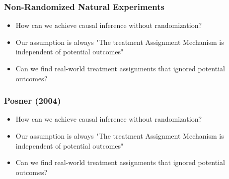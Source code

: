 \documentclass[xcolor=x11names,compress]{beamer}\usepackage[]{graphicx}\usepackage[]{color}
\renewcommand{\(}{\begin{columns}}
\renewcommand{\)}{\end{columns}}
\newcommand{\<}[1]{\begin{column}{#1}}
\renewcommand{\>}{\end{column}}
\begin{document}
\begin{frame}
\frametitle{Non-Randomized Natural Experiments}
\begin{itemize}
\item How can we achieve causal inference without randomization?
\pause
\item Our assumption is always "The treatment Assignment Mechanism is independent of potential outcomes"
\pause
\item Can we find real-world treatment assignments that ignored potential outcomes?
\end{itemize}
\end{frame}

\begin{frame}
\frametitle{Posner (2004)}
\begin{itemize}
\item How can we achieve causal inference without randomization?
\pause
\item Our assumption is always "The treatment Assignment Mechanism is independent of potential outcomes"
\pause
\item Can we find real-world treatment assignments that ignored potential outcomes?
\end{itemize}
\end{frame}
\end{document}
